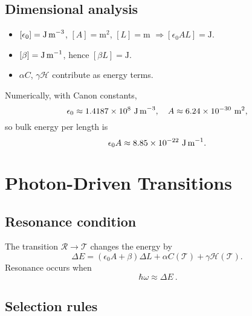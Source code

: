 \documentclass[11pt,a4paper]{article}
\begin{document}
    \subsection{Dimensional analysis}

        \begin{itemize}
        \item $[\epsilon_0]=\text{J\,m}^{-3}$, $[A]=\text{m}^2$, $[L]=\text{m}$ $\Rightarrow [\epsilon_0 A L]=\text{J}$.
        \item $[\beta]=\text{J\,m}^{-1}$, hence $[\beta L]=\text{J}$.
        \item $\alpha C$, $\gamma \mathcal H$ contribute as energy terms.
        \end{itemize}

        Numerically, with Canon constants,
        \begin{equation}
        \epsilon_0 \approx 1.4187\times10^{8}\ \text{J\,m}^{-3}, \quad
        A\approx 6.24\times10^{-30}\ \text{m}^2,
        \end{equation}
        so bulk energy per length is
        \begin{equation}
        \epsilon_0 A \approx 8.85\times10^{-22}\ \text{J\,m}^{-1}.
        \end{equation}

\section{Photon-Driven Transitions}

    \subsection{Resonance condition}

        The transition $\mathcal R\to \mathcal T$ changes the energy by
        \begin{equation}
        \Delta E = (\epsilon_0 A + \beta)\Delta L + \alpha C(\mathcal T) + \gamma \mathcal H(\mathcal T).
        \end{equation}
        Resonance occurs when
        \begin{equation}
        \boxed{\ \hbar \omega \approx \Delta E\ }.
        \end{equation}

    \subsection{Selection rules}
\end{document}
